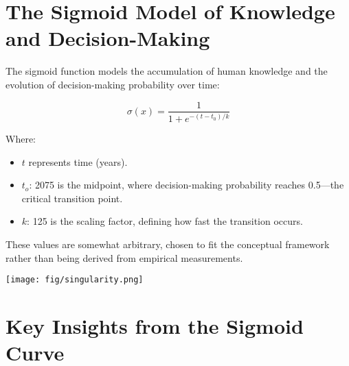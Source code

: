 \documentclass[a4]{article}
\begin{document}
\section{The Sigmoid Model of Knowledge and Decision-Making}

The sigmoid function models the accumulation of human knowledge and the evolution of decision-making probability over time:

$$
\sigma(x) = \frac{1}{1 + \displaystyle e^{-(t - t_0) / k}}
$$

Where:

\begin{itemize}
\item $t$ represents time (years).
\item  $t_o$: 2075 is the midpoint, where decision-making probability reaches 0.5---the critical transition point.
\item  $k$: 125 is the scaling factor, defining how fast the transition occurs.
\end{itemize}

These values are somewhat arbitrary, chosen to fit the conceptual framework rather than being derived from empirical measurements.

\begin{center}
\texttt{[image: fig/singularity.png]}
\end{center}

\section*{Key Insights from the Sigmoid Curve}
\end{document}
